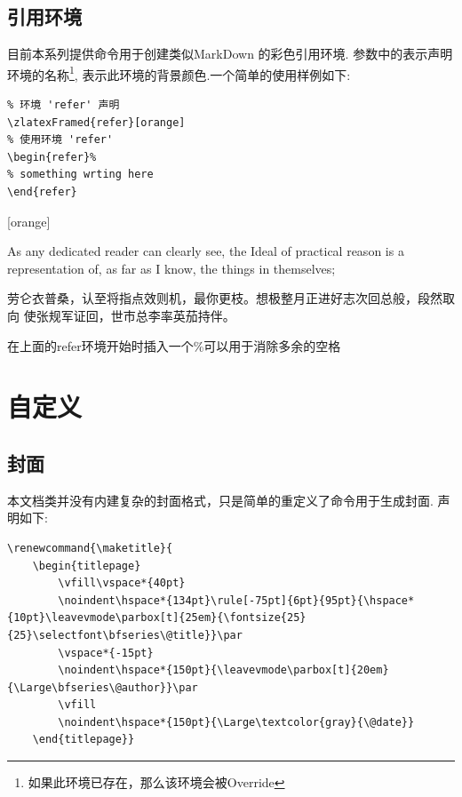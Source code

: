 \subsection{引用环境}
目前本系列提供命令\index{\cmd{\zlatexFramed}}用于创建类似MarkDown
的彩色引用环境. 参数中的表示声明环境的名称\footnote{如果此环境已存在，那么该环境会被Override},
表示此环境的背景颜色.一个简单的使用样例如下:

\begin{verbatim}
% 环境 'refer' 声明
\zlatexFramed{refer}[orange]
% 使用环境 'refer'
\begin{refer}%
% something wrting here
\end{refer}
\end{verbatim}

[orange]
\begin{refer}%
As any dedicated reader can clearly see, the Ideal of practical
reason is a representation of, as far as I know, the things in themselves;

劳仑衣普桑，认至将指点效则机，最你更枝。想极整月正进好志次回总般，段然取向
使张规军证回，世市总李率英茄持伴。
\end{refer}

\begin{leftbar}
    在上面的refer环境开始时插入一个\%可以用于消除多余的空格
\end{leftbar}

\section{自定义}
\subsection{封面}
本文档类并没有内建复杂的封面格式，只是简单的重定义了\cmd{\maketitle}命令用于生成封面. 
声明如下:
\begin{verbatim}
\renewcommand{\maketitle}{
    \begin{titlepage}
        \vfill\vspace*{40pt}
        \noindent\hspace*{134pt}\rule[-75pt]{6pt}{95pt}{\hspace*{10pt}\leavevmode\parbox[t]{25em}{\fontsize{25}{25}\selectfont\bfseries\@title}}\par
        \vspace*{-15pt}
        \noindent\hspace*{150pt}{\leavevmode\parbox[t]{20em}{\Large\bfseries\@author}}\par
        \vfill
        \noindent\hspace*{150pt}{\Large\textcolor{gray}{\@date}}
    \end{titlepage}} 
\end{verbatim}

